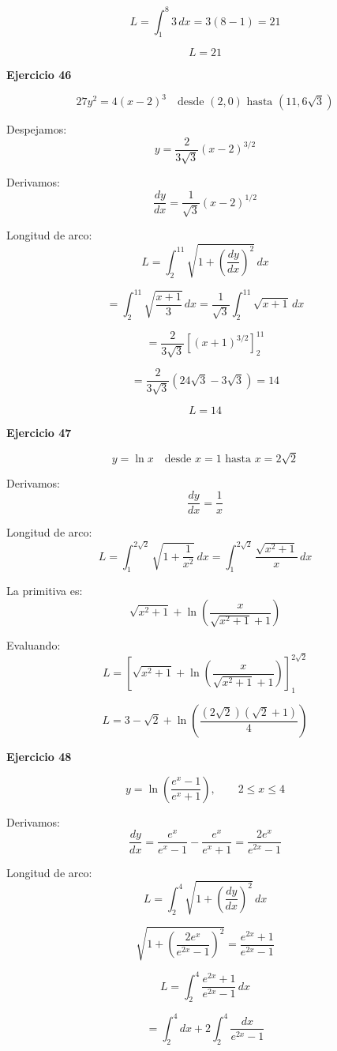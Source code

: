 \documentclass{article}
\begin{document}
\[
L=\int_{1}^{8} 3\,dx
=3(8-1)
=21
\]

\[
\boxed{L = 21}
\]

\textbf{Ejercicio 46}

\[
27y^2 = 4(x-2)^3
\quad \text{desde } (2,0) \text{ hasta } (11,6\sqrt{3})
\]

Despejamos:
\[
y = \frac{2}{3\sqrt{3}}(x-2)^{3/2}
\]

Derivamos:
\[
\frac{dy}{dx} = \frac{1}{\sqrt{3}}(x-2)^{1/2}
\]

Longitud de arco:
\[
L=\int_{2}^{11} \sqrt{1+\left(\frac{dy}{dx}\right)^2}\,dx
\]

\[
= \int_{2}^{11} \sqrt{\frac{x+1}{3}}\,dx
= \frac{1}{\sqrt{3}}\int_{2}^{11} \sqrt{x+1}\,dx
\]

\[
= \frac{2}{3\sqrt{3}}
\left[(x+1)^{3/2}\right]_{2}^{11}
\]

\[
= \frac{2}{3\sqrt{3}}(24\sqrt{3}-3\sqrt{3})
= 14
\]

\[
\boxed{L=14}
\]



\textbf{Ejercicio 47}

\[
y=\ln x \quad \text{desde } x=1 \text{ hasta } x=2\sqrt{2}
\]

Derivamos:
\[
\frac{dy}{dx}=\frac{1}{x}
\]

Longitud de arco:
\[
L=\int_{1}^{2\sqrt{2}} \sqrt{1+\frac{1}{x^2}}\,dx
=\int_{1}^{2\sqrt{2}} \frac{\sqrt{x^2+1}}{x}\,dx
\]

La primitiva es:
\[
\sqrt{x^2+1}
+\ln\!\left(\frac{x}{\sqrt{x^2+1}+1}\right)
\]

Evaluando:
\[
L=\left[
\sqrt{x^2+1}
+\ln\!\left(\frac{x}{\sqrt{x^2+1}+1}\right)
\right]_{1}^{2\sqrt{2}}
\]

\[
\boxed{
L=3-\sqrt{2}
+\ln\!\left(\frac{(2\sqrt{2})(\sqrt{2}+1)}{4}\right)
}
\]

\textbf{Ejercicio 48}

\[
y=\ln\!\left(\frac{e^x-1}{e^x+1}\right),
\qquad 2\le x\le 4
\]

Derivamos:
\[
\frac{dy}{dx}
=\frac{e^x}{e^x-1}-\frac{e^x}{e^x+1}
=\frac{2e^x}{e^{2x}-1}
\]

Longitud de arco:
\[
L=\int_{2}^{4}\sqrt{1+\left(\frac{dy}{dx}\right)^2}\,dx
\]

\[
\sqrt{1+\left(\frac{2e^x}{e^{2x}-1}\right)^2}
=\frac{e^{2x}+1}{e^{2x}-1}
\]

\[
L=\int_{2}^{4}\frac{e^{2x}+1}{e^{2x}-1}\,dx
\]

\[
= \int_{2}^{4}dx
+2\int_{2}^{4}\frac{dx}{e^{2x}-1}
\]
\end{document}

